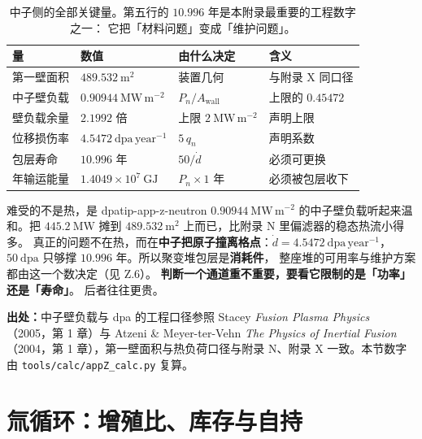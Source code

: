 \begin{table}[htbp]
\centering
\small
\caption{中子侧的全部关键量。第五行的 $10.996$ 年是本附录最重要的工程数字之一：
它把「材料问题」变成「维护问题」。}
\label{tab:app-z-neutron}
\begin{tabular}{p{3.4cm}p{3.0cm}p{3.4cm}p{3.3cm}}
\toprule
量 & 数值 & 由什么决定 & 含义 \\
\midrule
第一壁面积 & $489.532\ \mathrm{m^2}$ & 装置几何 & 与附录 X 同口径 \\
中子壁负载 & $0.90944\ \mathrm{MW\,m^{-2}}$ & $P_n/A_{\mathrm{wall}}$ & 上限的 $0.45472$ \\
壁负载余量 & $2.1992$ 倍 & 上限 $2\ \mathrm{MW\,m^{-2}}$ & 声明上限 \\
位移损伤率 & $4.5472\ \mathrm{dpa\,year^{-1}}$ & $5\,q_n$ & 声明系数 \\
包层寿命 & $10.996$ 年 & $50/\dot d$ & 必须可更换 \\
年输运能量 & $1.4049\times10^{7}\ \mathrm{GJ}$ & $P_n\times1$ 年 & 必须被包层收下 \\
\bottomrule
\end{tabular}

\end{table}

\begin{tip}{难受的不是热，是 dpa}{tip-app-z-neutron}
$0.90944\ \mathrm{MW\,m^{-2}}$ 的中子壁负载听起来温和。把 $445.2\ \mathrm{MW}$
摊到 $489.532\ \mathrm{m^2}$ 上而已，比附录 N 里偏滤器的稳态热流小得多。
真正的问题不在热，而在\textbf{中子把原子撞离格点}：$\dot d = 4.5472\ \mathrm{dpa\,year^{-1}}$，
$50\ \mathrm{dpa}$ 只够撑 $10.996$ 年。所以聚变堆包层是\textbf{消耗件}，
整座堆的可用率与维护方案都由这一个数决定（见 Z.6）。
\textbf{判断一个通道重不重要，要看它限制的是「功率」还是「寿命」}。
后者往往更贵。
\end{tip}

{\footnotesize
\textbf{出处：}中子壁负载与 dpa 的工程口径参照 Stacey \emph{Fusion Plasma Physics}
（2005，第 1 章）与 Atzeni \& Meyer-ter-Vehn \emph{The Physics of Inertial Fusion}
（2004，第 1 章），第一壁面积与热负荷口径与附录 N、附录 X 一致。本节数字由
\texttt{tools/\allowbreak{}calc/\allowbreak{}appZ\_calc.py} 复算。
}

\section{氚循环：增殖比、库存与自持}
\label{sec:app-z-tritium}

